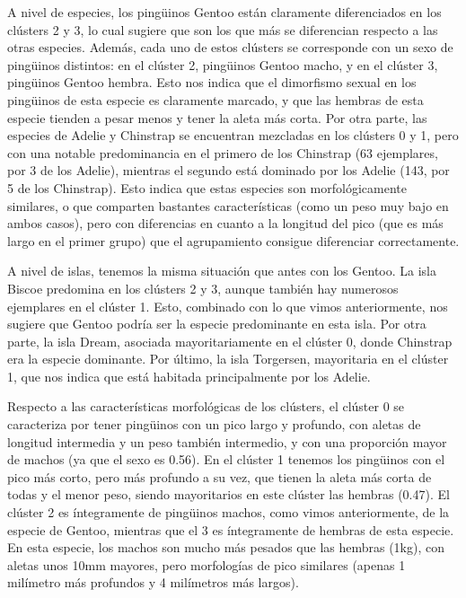 \documentclass[a4paper,onecolumn]{extarticle}
\begin{document}
\begin{sloppypar}
A nivel de especies, los pingüinos Gentoo están claramente diferenciados en los clústers 2 y 3, lo cual sugiere que son los que más se diferencian respecto a 
las otras especies. Además, cada uno de estos clústers se corresponde con un sexo de pingüinos distintos: en el clúster 2, pingüinos Gentoo macho, y en el 
clúster 3, pingüinos Gentoo hembra. Esto nos indica que el dimorfismo sexual en los pingüinos de esta especie es claramente marcado, y que las hembras  de esta 
especie tienden a pesar menos y tener la aleta más corta. Por otra parte, las especies de Adelie y Chinstrap se encuentran mezcladas en los clústers 0 y 1, pero 
con una notable predominancia en el primero de los Chinstrap (63 ejemplares, por 3 de los Adelie), mientras el segundo está dominado por los Adelie (143, por 
5 de los Chinstrap). Esto indica que estas especies son morfológicamente similares, o que comparten bastantes características (como un peso muy bajo en ambos 
casos), pero con diferencias en cuanto a la longitud del pico (que es más largo en el primer grupo) que el agrupamiento consigue diferenciar correctamente.

A nivel de islas, tenemos la misma situación que antes con los Gentoo. La isla Biscoe predomina en los clústers 2 y 3, aunque también hay numerosos ejemplares 
en el clúster 1. Esto, combinado con lo que vimos anteriormente, nos sugiere que Gentoo podría ser la especie predominante en esta isla. Por otra parte, la isla 
Dream, asociada mayoritariamente en el clúster 0, donde Chinstrap era la especie dominante. Por último, la isla Torgersen, mayoritaria en el clúster 1, que 
nos indica que está habitada principalmente por los Adelie.

Respecto a las características morfológicas de los clústers, el clúster 0 se caracteriza por tener pingüinos con un pico largo y profundo, con aletas de longitud 
intermedia y un peso también intermedio, y con una proporción mayor de machos (ya que el sexo es 0.56). En el clúster 1 tenemos los pingüinos con el pico más 
corto, pero más profundo a su vez, que tienen la aleta más corta de todas y el menor peso, siendo mayoritarios en este clúster las hembras (0.47). El clúster 
2 es íntegramente de pingüinos machos, como vimos anteriormente, de la especie de Gentoo, mientras que el 3 es íntegramente de hembras de esta especie. En esta 
especie, los machos son mucho más pesados que las hembras (1kg), con aletas unos 10mm mayores, pero morfologías de pico similares (apenas 1 milímetro más 
profundos y 4 milímetros más largos).


\end{sloppypar}
\end{document}
